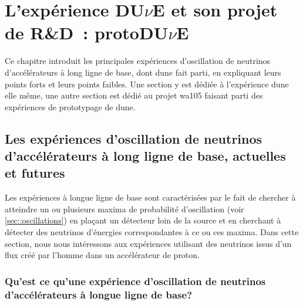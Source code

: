 \chapter{L'expérience \texorpdfstring{DU$\nu$E}{DUNE} et son projet de R\&D~: \texorpdfstring{protoDU$\nu$E}{protoDUNE}}
    
    Ce chapitre introduit les principales expériences d'oscillation de neutrinos d'accélérateurs à long ligne de base, dont \gls{dune} fait parti, en expliquant leurs points forts et leurs points faibles. Une section y est dédiée à l'expérience \gls{dune} elle même, une autre section est dédié au projet \gls{wa105} faisant parti des expériences de prototypage de \gls{dune}.
        
    \section{Les expériences d'oscillation de neutrinos d'accélérateurs à long ligne de base, actuelles et futures}
    
        Les expériences à longue ligne de base sont caractérisées par le fait de chercher à atteindre un ou plusieurs maxima de probabilité d'oscillation (voir \autoref{sec::oscillations}) en plaçant un détecteur loin de la source et en cherchant à détecter des neutrinos d'énergies correspondantes à ce ou ces maxima. Dans cette section, nous nous intéressons aux expériences utilisant des neutrinos issus d'un flux créé par l'homme dans un accélérateur de proton.
    
        \subsection{Qu'est ce qu'une expérience d'oscillation de neutrinos d'accélérateurs à longue ligne de base?}
            
